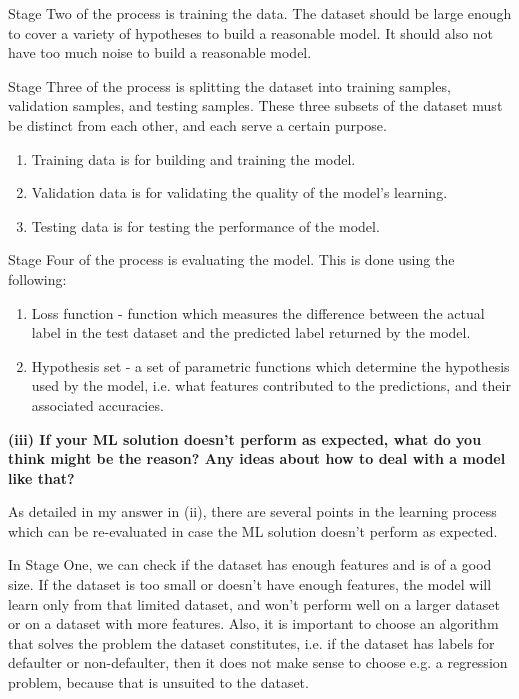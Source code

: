 \documentclass{article}
\begin{document}
Stage Two of the process is training the data. The dataset should be large enough to cover a variety of hypotheses to build a reasonable model. It should also not have too much noise to build a reasonable model.

Stage Three of the process is splitting the dataset into training samples, validation samples, and testing samples. These three subsets of the dataset must be distinct from each other, and each serve a certain purpose.
\begin{enumerate}
    \item Training data is for building and training the model. 
    \item Validation data is for validating the quality of the model's learning. 
    \item Testing data is for testing the performance of the model.
\end{enumerate}

Stage Four of the process is evaluating the model. This is done using the following:
\begin{enumerate}
    \item Loss function - function which measures the difference between the actual label in the test dataset and the predicted label returned by the model.
    \item Hypothesis set - a set of parametric functions which determine the hypothesis used by the model, i.e. what features contributed to the predictions, and their associated accuracies.
\end{enumerate}
\newline

\noindent \textbf{(iii) If your ML solution doesn't perform as expected, what do you think might be the reason? Any ideas about how to deal with a model like that?}

As detailed in my answer in (ii), there are several points in the learning process which can be re-evaluated in case the ML solution doesn't perform as expected. 

In Stage One, we can check if the dataset has enough features and is of a good size. If the dataset is too small or doesn't have enough features, the model will learn only from that limited dataset, and won't perform well on a larger dataset or on a dataset with more features. Also, it is important to choose an algorithm that solves the problem the dataset constitutes, i.e. if the dataset has labels for defaulter or non-defaulter, then it does not make sense to choose e.g. a regression problem, because that is unsuited to the dataset.
\end{document}
